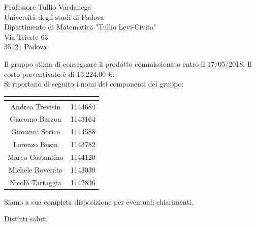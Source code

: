 \begin{letter}{Professore Tullio Vardanega \\ Università degli studi di Padova \\ Dipartimento di Matematica "Tullio Levi-Civita" \\ Via Trieste 63 \\ 35121 Padova}
\begin{addmargin}[2em]{2em}
  Il gruppo stima di consegnare il prodotto commissionato entro il 17/05/2018. Il costo preventivato è di 13.224,00 \euro.\\
  
  Si riportano di seguito i nomi dei componenti del gruppo:
\renewcommand{\arraystretch}{2}
\tabcolsep=16mm
	\begin{center}
		\begin{tabular}{| c | c |}
			\hline
			\rowcolor{title_row}
			\textbf{\color{title_text}{Nominativo}} & \textbf{\color{title_text}{Matricola}}\\ \hline
			Andrea Trevisin & 1144684\\ \hline
			Giacomo Barzon & 1143164\\ \hline
			Giovanni Sorice & 1144588\\ \hline
			Lorenzo Busin & 1143782\\ \hline
			Marco Costantino & 1144120\\ \hline
			Michele Roverato & 1143030\\ \hline
			Nicolò Tartaggia & 1142836\\ 
			\hline
		\end{tabular}
	\end{center}
\renewcommand{\arraystretch}{1}

Siamo a sua completa disposizione per eventuali chiarimenti.
\end{addmargin}

\closing{Distinti saluti,}




\end{letter}
 

